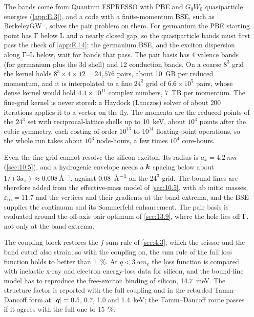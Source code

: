 The bands come from Quantum ESPRESSO with PBE and $G_0W_0$ quasiparticle energies (\cref{app:E.3}), and a code with a finite-momentum BSE, such as BerkeleyGW~\cite{deslippe2012berkeleygw}, solves the pair problem on them. For germanium the PBE starting point has $\mathrm{\Gamma}$ below L and a nearly closed gap, so the quasiparticle bands must first pass the check of \cref{app:E.14}; the germanium BSE, and the exciton dispersion along $\mathrm{\Gamma}$--L below, wait for bands that pass. The pair basis has 4 valence bands (for germanium plus the 3d shell) and 12 conduction bands. On a coarse $8^3$ grid the kernel holds $8^3\times4\times12 = 24{,}576$ pairs, about \SI{10}{GB} per reduced momentum, and it is interpolated to a fine $24^3$ grid of $6.6\times10^5$ pairs, whose dense kernel would hold $4.4\times10^{11}$ complex numbers, \SI{7}{TB} per momentum. The fine-grid kernel is never stored: a Haydock (Lanczos) solver of about 200 iterations applies it to a vector on the fly. The momenta are the reduced points of the $24^3$ set with reciprocal-lattice shells up to \SI{10}{keV}, about $10^3$ points after the cubic symmetry, each costing of order $10^{13}$ to $10^{14}$ floating-point operations, so the whole run takes about $10^3$ node-hours, a few times $10^4$ core-hours.

Even the fine grid cannot resolve the silicon exciton. Its radius is $a_x = \SI{4.2}{nm}$ (\cref{sec:10.5}), and a hydrogenic envelope needs a $\bm{k}$ spacing below about $1/(3a_x) \approx \SI{0.008}{\angstrom^{-1}}$, against \SI{0.08}{\angstrom^{-1}} on the $24^3$ grid. The bound lines are therefore added from the effective-mass model of \cref{sec:10.5}, with ab initio masses, $\varepsilon_\infty = 11.7$ and the vertices and their gradients at the band extrema, and the BSE supplies the continuum and its Sommerfeld enhancement. The pair basis is evaluated around the off-axis pair optimum of \cref{sec:13.9}, where the hole lies off $\mathrm{\Gamma}$, not only at the band extrema.

The coupling block restores the $f$-sum rule of \cref{sec:4.3}, which the scissor and the band cutoff also strain, so with the coupling on, the sum rule of the full loss function holds to better than \SI{1}{\percent}. At $q < 3\,\alpha m_e$ the loss function is compared with inelastic x-ray and electron energy-loss data for silicon, and the bound-line model has to reproduce the free-exciton binding of silicon, \SI{14.7}{meV}. The structure factor is reported with the full coupling and in the retarded Tamm--Dancoff form at $|\bm{q}| = 0.5$, 0.7, 1.0 and \SI{1.4}{keV}; the Tamm--Dancoff route passes if it agrees with the full one to \SI{15}{\percent}.

